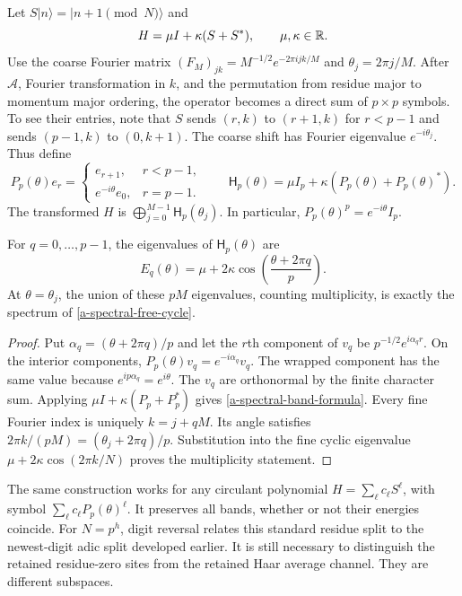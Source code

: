 Let $S|n\rangle=|n+1\pmod N\rangle$ and
\begin{equation}
 H=\mu I+\kappa(S+S^*),\qquad \mu,\kappa\in\mathbb R.
 \label{a-spectral-free-cycle}
\end{equation}
Use the coarse Fourier matrix
$(F_M)_{jk}=M^{-1/2}e^{-2\pi ijk/M}$ and
$\theta_j=2\pi j/M$. After $\mathcal A$, Fourier transformation in $k$,
and the permutation from residue major to momentum major ordering, the
operator becomes a direct sum of $p\times p$ symbols. To see their entries,
note that $S$ sends $(r,k)$ to $(r+1,k)$ for $r<p-1$ and sends
$(p-1,k)$ to $(0,k+1)$. The coarse shift has Fourier eigenvalue
$e^{-i\theta_j}$. Thus define
\begin{equation}
 P_p(\theta)e_r=
 \begin{cases}
 e_{r+1},&r<p-1,\\
 e^{-i\theta}e_0,&r=p-1.
 \end{cases}
 \qquad
 \mathsf H_p(\theta)=\mu I_p+\kappa(P_p(\theta)+P_p(\theta)^*).
 \label{a-spectral-bloch-symbol}
\end{equation}
The transformed $H$ is $\bigoplus_{j=0}^{M-1}\mathsf H_p(\theta_j)$.
In particular, $P_p(\theta)^p=e^{-i\theta}I_p$.

\begin{proposition}
\label{a-spectral-folded-bands}
For $q=0,\ldots,p-1$, the eigenvalues of
$\mathsf H_p(\theta)$ are
\begin{equation}
 E_q(\theta)=\mu+2\kappa
     \cos\!\left(\frac{\theta+2\pi q}{p}\right).
 \label{a-spectral-band-formula}
\end{equation}
At $\theta=\theta_j$, the union of these $pM$ eigenvalues, counting
multiplicity, is exactly the spectrum of \eqref{a-spectral-free-cycle}.
\end{proposition}
\begin{proof}
Put $\alpha_q=(\theta+2\pi q)/p$ and let the $r$th component of
$v_q$ be $p^{-1/2}e^{i\alpha_qr}$. On the interior components,
$P_p(\theta)v_q=e^{-i\alpha_q}v_q$. The wrapped component has the
same value because $e^{ip\alpha_q}=e^{i\theta}$. The $v_q$ are
orthonormal by the finite character sum. Applying
$\mu I+\kappa(P_p+P_p^*)$ gives \eqref{a-spectral-band-formula}.
Every fine Fourier index is uniquely $k=j+qM$. Its angle satisfies
$2\pi k/(pM)=(\theta_j+2\pi q)/p$. Substitution into the fine cyclic
eigenvalue $\mu+2\kappa\cos(2\pi k/N)$ proves the multiplicity statement.
\end{proof}

The same construction works for any circulant polynomial
$H=\sum_\ell c_\ell S^\ell$, with symbol
$\sum_\ell c_\ell P_p(\theta)^\ell$. It preserves all bands, whether or
not their energies coincide. For $N=p^h$, digit reversal relates this
standard residue split to the newest-digit adic split developed earlier.
It is still necessary to distinguish the retained residue-zero sites
from the retained Haar average channel. They are different subspaces.

